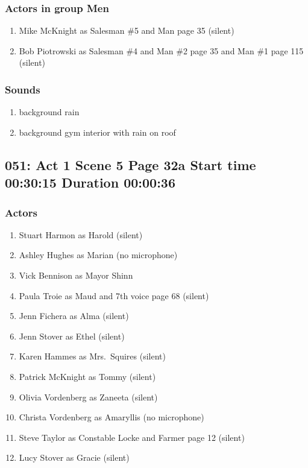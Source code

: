 \subsubsection{Actors in group Men}
\begin{enumerate}
\item Mike McKnight as Salesman \#5 and Man page 35 (silent)
\item Bob Piotrowski as Salesman \#4 and Man \#2 page 35 and Man \#1 page 115 (silent)
\end{enumerate}

\subsubsection{Sounds}
\begin{enumerate}
\item background rain
\item background gym interior with rain on roof
\end{enumerate}
\subsection{051: Act 1 Scene 5 Page 32a Start time 00:30:15 Duration 00:00:36}

\subsubsection{Actors}
\begin{enumerate}
\item Stuart Harmon as Harold (silent)
\item Ashley Hughes as Marian (no microphone)
\item Vick Bennison as Mayor Shinn
\item Paula Troie as Maud and 7th voice page 68 (silent)
\item Jenn Fichera as Alma (silent)
\item Jenn Stover as Ethel (silent)
\item Karen Hammes as Mrs.~Squires (silent)
\item Patrick McKnight as Tommy (silent)
\item Olivia Vordenberg as Zaneeta (silent)
\item Christa Vordenberg as Amaryllis (no microphone)
\item Steve Taylor as Constable Locke and Farmer page 12 (silent)
\item Lucy Stover as Gracie (silent)
\end{enumerate}
